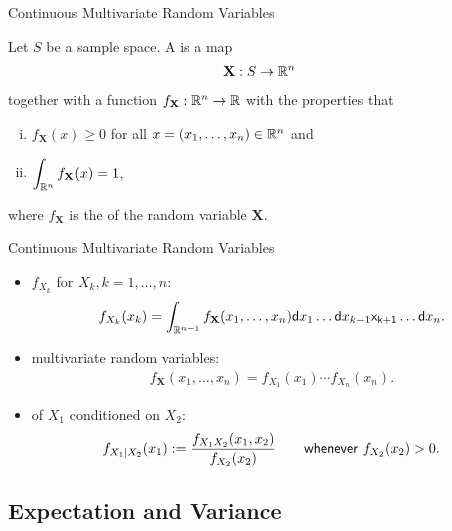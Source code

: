 \begin{frame}{Continuous Multivariate Random Variables}

\justifying
{} Let $S$ be a sample space. A  is a map
\begin{align*}
\mathbf{X}: S\rightarrow \mathbb{R}^n
\end{align*}
together with a function $f_{\mathbf{X}}: \mathbb{R}^n\rightarrow\mathbb{R}$ with the properties that
\begin{enumerate}[(i).]
	\item $f_{\mathbf{X}}(x) \geq 0$ for all $x = (x_1, \ldots, x_n)\in \mathbb{R}^n$ and
	\item $\displaystyle \int_{\mathbb{R}^n} f_{\mathbf{X}}(x) = 1$,
\end{enumerate}
where $f_{\mathbf{X}}$ is the  of the random variable $\mathbf{X}$.

\end{frame}

\begin{frame}{Continuous Multivariate Random Variables}

\justifying
{} 
\begin{itemize}
\item {} $f_{X_k}$ for $X_k, k = 1, \ldots, n$:
\begin{align*}
f_{X_k}(x_k) = \int_{\mathbb{R}^{n-1}} f_{\mathbf{X}}(x_1, \ldots, x_n) \mathsf{d}x_1\ldots \mathsf{d}x_{k-1}\mathsf{x_{k+1}}\ldots \mathsf{d}x_n.
\end{align*}
\item {} multivariate random variables:
\begin{align*}
f_{\mathbf{X}}(x_1, \ldots, x_n) = f_{X_1}(x_1)\cdots f_{X_n}(x_n).
\end{align*}
\item {} of $X_1$ conditioned on $X_2$:
\begin{align*}
f_{X_1|X_2}(x_1) := \frac{f_{X_1X_2}(x_1, x_2)}{f_{X_2}(x_2)} \qquad \mathsf{whenever\ } f_{X_2}(x_2) > 0.
\end{align*}
\end{itemize}

\end{frame}


\subsection{Expectation and Variance}


